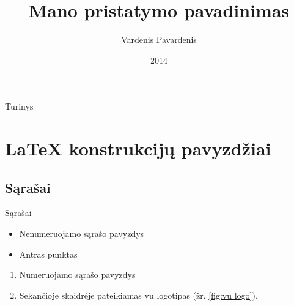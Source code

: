 \documentclass{beamer}
\title{Mano pristatymo pavadinimas}
\author{Vardenis Pavardenis}
\institute[Vilniaus Universitetas]
{
  \inst{1}%
  Matematikos ir informatikos institutas\\
  Vilniaus universitetas
}
\date{2014}
\begin{document}
\begin{frame}
  \titlepage
\end{frame}

\begin{frame}{Turinys}
  \tableofcontents
\end{frame}

\section{LaTeX konstrukcijų pavyzdžiai}
\subsection{Sąrašai}
\begin{frame}{Sąrašai}
\begin{itemize}
    \item Nenumeruojamo sąrašo pavyzdys
    \item Antras punktas
\end{itemize}

\begin{enumerate}
    \item Numeruojamo sąrašo pavyzdys
    \item Sekančioje skaidrėje pateikiamas vu logotipas (žr. \ref{fig:vu logo}).
\end{enumerate}
\end{frame}
\end{document}
